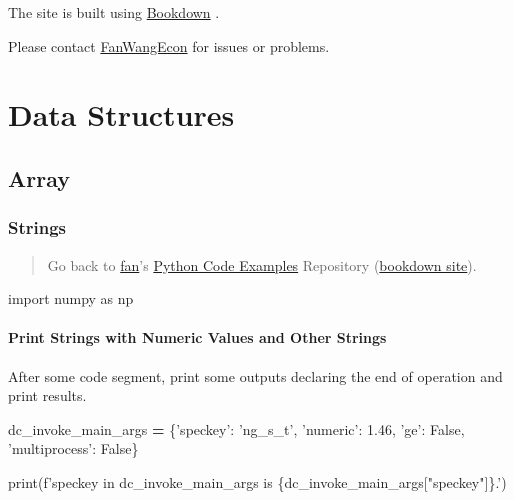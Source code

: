 \documentclass[
]{book}
\newenvironment{Shaded}{\begin{snugshade}}{\end{snugshade}}
\newcommand{\BuiltInTok}[1]{#1}
\newcommand{\FloatTok}[1]{\textcolor[rgb]{0.00,0.00,0.81}{#1}}
\newcommand{\ImportTok}[1]{#1}
\newcommand{\NormalTok}[1]{#1}
\newcommand{\OperatorTok}[1]{\textcolor[rgb]{0.81,0.36,0.00}{\textbf{#1}}}
\newcommand{\SpecialCharTok}[1]{\textcolor[rgb]{0.00,0.00,0.00}{#1}}
\newcommand{\SpecialStringTok}[1]{\textcolor[rgb]{0.31,0.60,0.02}{#1}}
\newcommand{\StringTok}[1]{\textcolor[rgb]{0.31,0.60,0.02}{#1}}
\newcommand{\VariableTok}[1]{\textcolor[rgb]{0.00,0.00,0.00}{#1}}
\begin{document}
The site is built using \href{https://bookdown.org/}{Bookdown} \citep{R-bookdown}.

Please contact \href{https://fanwangecon.github.io/}{FanWangEcon} for issues or problems.

\hypertarget{data-structures}{%
\chapter{Data Structures}\label{data-structures}}

\hypertarget{array}{%
\section{Array}\label{array}}

\hypertarget{strings}{%
\subsection{Strings}\label{strings}}

\begin{quote}
Go back to \href{http://fanwangecon.github.io/}{fan}'s \href{https://fanwangecon.github.io/pyfan/}{Python Code Examples} Repository (\href{https://fanwangecon.github.io/pyfan/bookdown}{bookdown site}).
\end{quote}

\begin{Shaded}
\begin{Highlighting}[]
\ImportTok{import}\NormalTok{ numpy }\ImportTok{as}\NormalTok{ np}
\end{Highlighting}
\end{Shaded}

\hypertarget{print-strings-with-numeric-values-and-other-strings}{%
\subsubsection{Print Strings with Numeric Values and Other Strings}\label{print-strings-with-numeric-values-and-other-strings}}

After some code segment, print some outputs declaring the end of operation and print results.

\begin{Shaded}
\begin{Highlighting}[]
\NormalTok{dc_invoke_main_args }\OperatorTok{=}\NormalTok{ \{}\StringTok{'speckey'}\NormalTok{: }\StringTok{'ng_s_t'}\NormalTok{,}
                       \StringTok{'numeric'}\NormalTok{: }\FloatTok{1.46}\NormalTok{,}
                       \StringTok{'ge'}\NormalTok{: }\VariableTok{False}\NormalTok{,}
                       \StringTok{'multiprocess'}\NormalTok{: }\VariableTok{False}\NormalTok{\}}
                       
\BuiltInTok{print}\NormalTok{(}\SpecialStringTok{f'speckey in dc_invoke_main_args is }\SpecialCharTok{\{}\NormalTok{dc_invoke_main_args[}\StringTok{"speckey"}\NormalTok{]}\SpecialCharTok{\}}\SpecialStringTok{.'}\NormalTok{)}
\end{Highlighting}
\end{Shaded}
\end{document}
